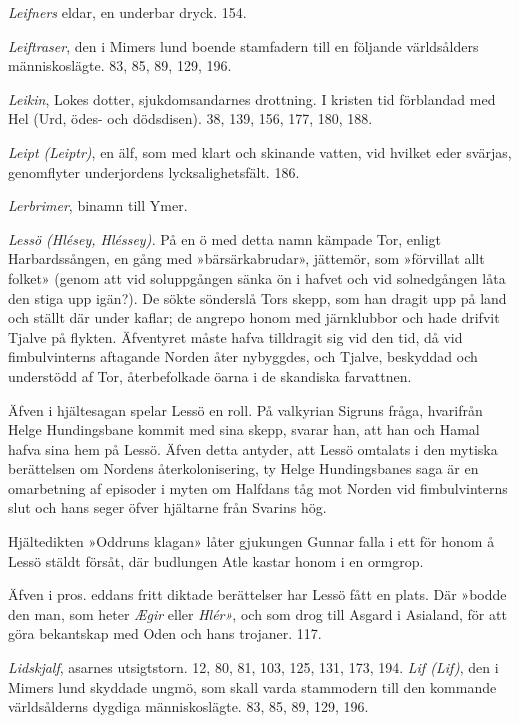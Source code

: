 \emph{Leifners} eldar, en underbar dryck. 154.

\emph{Leiftraser}, den i Mimers lund boende stamfadern till en följande
världsålders människoslägte. 83, 85, 89, 129, 196.

\emph{Leikin}, Lokes dotter, sjukdomsandarnes drottning. I kristen tid
förblandad med Hel (Urd, ödes- och dödsdisen). 38, 139, 156, 177, 180,
188.

\emph{Leipt (Leiptr)}, en älf, som med klart och skinande vatten, vid
hvilket eder svärjas, genomflyter underjordens lycksalighetsfält. 186.

\emph{Lerbrimer}, binamn till Ymer.

\emph{Lessö (Hlésey, Hléssey).} På en ö med detta namn kämpade Tor,
enligt Harbardssången, en gång med »bärsärkabrudar», jättemör, som
»förvillat allt folket» (genom att vid soluppgången sänka ön i hafvet
och vid solnedgången låta den stiga upp igän?). De sökte sönderslå Tors
skepp, som han dragit upp på land och ställt där under kaflar;
\protect\hypertarget{lb1625905.xhtmlux5cux23start229}{}{}\protect\hypertarget{lb1625905.xhtmlux5cux23start229-a}{}{}\protect\hypertarget{lb1625905.xhtmlux5cux23start229-b}{}{}\protect\hypertarget{lb1625905.xhtmlux5cux23start229-c}{}{}\protect\hypertarget{lb1625905.xhtmlux5cux23start229-d}{}{}
de angrepo honom med järnklubbor och hade drifvit Tjalve på flykten.
Äfventyret måste hafva tilldragit sig vid den tid, då vid fimbulvinterns
aftagande Norden åter nybyggdes, och Tjalve, beskyddad och understödd af
Tor, återbefolkade öarna i de skandiska farvattnen.

Äfven i hjältesagan spelar Lessö en roll. På valkyrian Sigruns fråga,
hvarifrån Helge Hundingsbane kommit med sina skepp, svarar han, att han
och Hamal hafva sina hem på Lessö. Äfven detta antyder, att Lessö
omtalats i den mytiska berättelsen om Nordens återkolonisering, ty Helge
Hundingsbanes saga är en omarbetning af episoder i myten om Halfdans tåg
mot Norden vid fimbulvinterns slut och hans seger öfver hjältarne från
Svarins hög.

Hjältedikten »Oddruns klagan» låter gjukungen Gunnar falla i ett för
honom å Lessö stäldt försåt, där budlungen Atle kastar honom i en
ormgrop.

Äfven i pros. eddans fritt diktade berättelser har Lessö fått en plats.
Där »bodde den man, som heter \emph{Ægir} eller \emph{Hlér»}, och som
drog till Asgard i Asialand, för att göra bekantskap med Oden och hans
trojaner. 117.

\emph{Lidskjalf}, asarnes utsigtstorn. 12, 80, 81, 103, 125, 131, 173,
194. \emph{Lif (Lif)}, den i Mimers lund skyddade ungmö, som skall varda
stammodern till den kommande världsålderns dygdiga människoslägte. 83,
85, 89, 129, 196.

